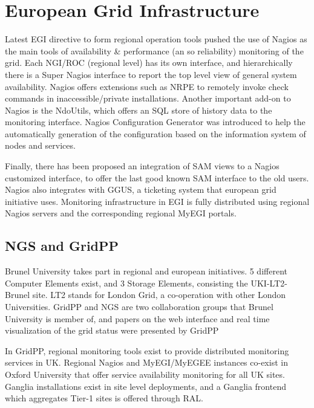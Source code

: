 \section{European Grid Infrastructure}
Latest EGI directive to form regional operation tools pushed the use of Nagios \cite{imamagic2007grid} as the main tools of availability \& performance (an so reliability) monitoring of the grid. Each NGI/ROC (regional level) has its own interface, and hierarchically there is a Super Nagios interface to report the top level view of general system availability. Nagios offers extensions such as NRPE to remotely invoke check commands in inaccessible/private installations. Another important add-on to Nagios is the NdoUtils, which offers an SQL store of history data to the monitoring interface. Nagios Configuration Generator was introduced to help the automatically generation of the configuration based on the information system of nodes and services.

Finally, there has been proposed an integration of SAM views to a Nagios customized interface, to offer the last good known SAM interface to the old users. Nagios also integrates with GGUS, a ticketing system that european grid initiative uses. Monitoring infrastructure in EGI is fully distributed using regional Nagios servers and the corresponding regional MyEGI portals.

\subsection{NGS and GridPP}
Brunel University takes part in regional and european initiatives. 5 different Computer Elements exist, and 3 Storage Elements, consisting the UKI-LT2-Brunel site. LT2 stands for London Grid, a co-operation with other London Universities. GridPP and NGS are two collaboration groups that Brunel University is member of, and papers on the web interface \cite{Hobson2007} and real time visualization of the grid status were presented \cite{Huang2007} by GridPP

In GridPP, regional monitoring tools exist to provide distributed monitoring services in UK. Regional Nagios and MyEGI/MyEGEE instances co-exist in Oxford University that offer service availability monitoring for all UK sites. Ganglia installations exist in site level deployments, and a Ganglia frontend which aggregates Tier-1 sites is offered through RAL.
